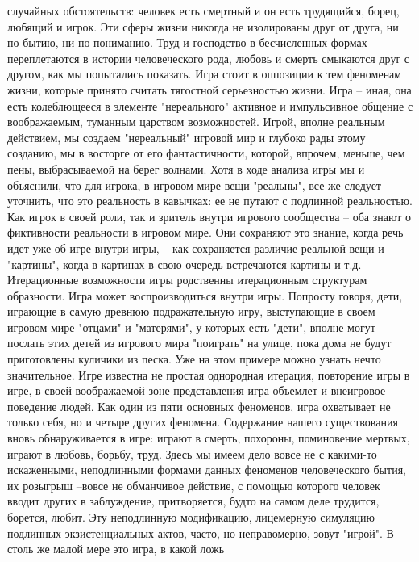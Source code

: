 \documentclass[12pt]{article}
\begin{document}
случайных обстоятельств: человек есть смертный и он есть трудящийся, борец, любящий и игрок. Эти сферы
жизни  никогда  не  изолированы  друг  от  друга,  ни  по  бытию,  ни  по  пониманию.  Труд  и  господство  в
бесчисленных формах переплетаются в истории человеческого рода, любовь и смерть смыкаются друг с другом,
как  мы  попытались  показать.  Игра  стоит  в  оппозиции  к  тем  феноменам  жизни,  которые  принято  считать
тягостной серьезностью жизни. Игра -- иная, она есть колеблющееся в элементе "нереального" активное и
импульсивное  общение  с  воображаемым,  туманным  царством  возможностей.  Игрой,  вполне  реальным
действием, мы создаем "нереальный" игровой мир и глубоко рады этому созданию, мы в восторге от его
фантастичности, которой, впрочем, меньше, чем пены, выбрасываемой на берег волнами. Хотя в ходе анализа
игры мы и объяснили, что для игрока, в игровом мире вещи "реальны", все же следует уточнить, что это
реальность в кавычках: ее не путают с подлинной реальностью. Как игрок в своей роли, так и зритель внутри
игрового сообщества -- оба знают о фиктивности реальности в игровом мире. Они сохраняют это знание, когда
речь идет уже об игре внутри игры, -- как сохраняется различие реальной вещи и "картины", когда в картинах в
свою  очередь  встречаются  картины  и  т.д.  Итерационные  возможности  игры  родственны  итерационным
структурам образности. Игра может воспроизводиться внутри игры. Попросту говоря, дети, играющие в самую
древнюю подражательную игру, выступающие в своем игровом мире "отцами" и "матерями", у которых есть
"дети",  вполне  могут  послать  этих  детей  из  игрового  мира  "поиграть"  на  улице,  пока  дома  не  будут
приготовлены куличики из песка. Уже на этом примере можно узнать нечто значительное. Игре известна не
простая  однородная  итерация,  повторение  игры  в  игре,  в  своей  воображаемой  зоне  представления  игра
объемлет и внеигровое поведение людей. Как один из пяти основных феноменов, игра охватывает не только
себя, но и четыре других феномена. Содержание нашего существования вновь обнаруживается в игре: играют в
смерть, похороны, поминовение мертвых, играют в любовь, борьбу, труд. Здесь мы имеем дело вовсе не с
какими-то искаженными, неподлинными формами данных феноменов человеческого бытия, их розыгрыш --вовсе не обманчивое действие, с помощью которого человек вводит других в заблуждение, притворяется, будто
на самом деле трудится, борется, любит. Эту неподлинную модификацию, лицемерную симуляцию подлинных
экзистенциальных актов, часто, но неправомерно, зовут "игрой". В столь же малой мере это игра, в какой ложь  
\end{document}
